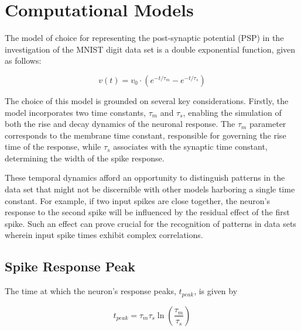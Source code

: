 \section{Computational Models}

The model of choice for representing the post-synaptic potential (PSP) in the investigation of the MNIST digit data set is a double exponential function, given as follows:

\begin{equation}
    v(t) = v_0 \cdot (e^{-t/\tau_m} - e^{-t/\tau_s})
\end{equation}

The choice of this model is grounded on several key considerations. Firstly, the model incorporates two time constants, $\tau_m$ and $\tau_s$, enabling the simulation of both the rise and decay dynamics of the neuronal response. The $\tau_m$ parameter corresponds to the membrane time constant, responsible for governing the rise time of the response, while $\tau_s$ associates with the synaptic time constant, determining the width of the spike response.

These temporal dynamics afford an opportunity to distinguish patterns in the data set that might not be discernible with other models harboring a single time constant. For example, if two input spikes are close together, the neuron's response to the second spike will be influenced by the residual effect of the first spike. Such an effect can prove crucial for the recognition of patterns in data sets wherein input spike times exhibit complex correlations.

\subsection{Spike Response Peak}

\begin{mdframed}[backgroundcolor=red_background, linecolor=black, linewidth=2pt, frametitle=\textbf{Statement}]
\begin{center}

    \label{st:peak}
    The time at which the neuron's response peaks, $t_{peak}$, is given by

    \begin{equation}
        t_{peak} = \tau_m \tau_s \ln\left(\frac{\tau_m}{\tau_s}\right)
    \end{equation}

\end{center}
\end{mdframed}

